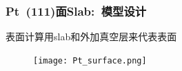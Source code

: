 \frame
{
	\frametitle{\textrm{Pt~(111)}面\textrm{Slab}:~模型设计}
表面计算用\textrm{slab}和外加真空层来代表表面
					\begin{minipage}[t]{0.60\textwidth}
\begin{figure}[h!]
\centering
\texttt{[image: Pt\_surface.png]}
\caption{\fontsize{6.2pt}{5.2pt}}%
\label{Pt_surface}
\end{figure}
					\end{minipage}
				\hfill
					\begin{minipage}[t]{0.38\textwidth}
{\fontsize{8.2pt}{5.2pt}}
					\end{minipage}
{\fontsize{6.2pt}{5.2pt}}\\%
}

